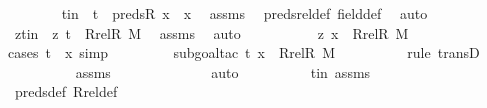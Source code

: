 \begin{isabellebody}
\ \ \ \ \ \ \isamarkupfalse%
\ tin\ {\isacharcolon}{\kern0pt}\ {\isachardoublequoteopen}t\ {\isasymin}\ preds{\isacharparenleft}{\kern0pt}R{\isacharcomma}{\kern0pt}\ x{\isacharparenright}{\kern0pt}\ {\isasymunion}\ {\isacharbraceleft}{\kern0pt}x{\isacharbraceright}{\kern0pt}{\isachardoublequoteclose}\ \isamarkupfalse%
\ assms{}\ \isamarkupfalse%
\ preds{\isacharunderscore}{\kern0pt}rel{\isacharunderscore}{\kern0pt}def\ field{\isacharunderscore}{\kern0pt}def\ \isamarkupfalse%
\ auto\ \isanewline
\ \ \ \ \ \ \isamarkupfalse%
\ ztin\ {\isacharcolon}{\kern0pt}\ {\isachardoublequoteopen}{\isacharless}{\kern0pt}z{\isacharcomma}{\kern0pt}\ t{\isachargreater}{\kern0pt}\ {\isasymin}\ Rrel{\isacharparenleft}{\kern0pt}R{\isacharcomma}{\kern0pt}\ M{\isacharparenright}{\kern0pt}{\isachardoublequoteclose}\ \isamarkupfalse%
\ assms{}\ \isamarkupfalse%
\ auto\ \isanewline
\ \ \ \ \ \ \isamarkupfalse%
\ \isamarkupfalse%
\ {\isachardoublequoteopen}{\isacharless}{\kern0pt}z{\isacharcomma}{\kern0pt}\ x{\isachargreater}{\kern0pt}\ {\isasymin}\ Rrel{\isacharparenleft}{\kern0pt}R{\isacharcomma}{\kern0pt}\ M{\isacharparenright}{\kern0pt}{\isachardoublequoteclose}\ \isanewline
\ \ \ \ \ \ \ \ \isamarkupfalse%
{\isacharparenleft}{\kern0pt}cases\ {\isachardoublequoteopen}t\ {\isacharequal}{\kern0pt}\ x{\isachardoublequoteclose}{\isacharcomma}{\kern0pt}\ simp{\isacharparenright}{\kern0pt}\isanewline
\ \ \ \ \ \ \ \ \isamarkupfalse%
{\isacharparenleft}{\kern0pt}subgoal{\isacharunderscore}{\kern0pt}tac\ {\isachardoublequoteopen}{\isacharless}{\kern0pt}t{\isacharcomma}{\kern0pt}\ x{\isachargreater}{\kern0pt}\ {\isasymin}\ Rrel{\isacharparenleft}{\kern0pt}R{\isacharcomma}{\kern0pt}\ M{\isacharparenright}{\kern0pt}{\isachardoublequoteclose}{\isacharparenright}{\kern0pt}\isanewline
\ \ \ \ \ \ \ \ \ \isamarkupfalse%
{\isacharparenleft}{\kern0pt}rule\ transD{\isacharparenright}{\kern0pt}\isanewline
\ \ \ \ \ \ \ \ \isamarkupfalse%
\ assms\ \isanewline
\ \ \ \ \ \ \ \ \ \ \ \isamarkupfalse%
\ auto{\isacharbrackleft}{\kern0pt}{}{\isacharbrackright}{\kern0pt}\isanewline
\ \ \ \ \ \ \ \ \isamarkupfalse%
\ tin\ assms\isanewline
\ \ \ \ \ \ \ \ \isamarkupfalse%
\ preds{\isacharunderscore}{\kern0pt}def\ Rrel{\isacharunderscore}{\kern0pt}def\ \isanewline
\ \ \ \ \ \ \ \ \isamarkupfalse%

\end{isabellebody}
